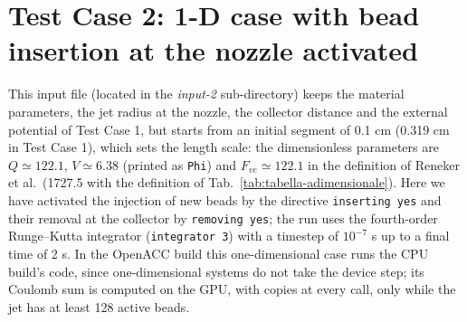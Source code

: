 \section{Test Case 2: 1-D case with bead insertion at the nozzle activated}

This input file (located in the \textit{input-2} sub-directory) keeps the
material parameters, the jet radius at the nozzle, the collector distance and
the external potential of Test Case 1, but starts from an initial segment of
0.1 cm (0.319 cm in Test Case 1), which sets the length scale: the
dimensionless parameters are $Q\simeq122.1$, $V\simeq6.38$ (printed as
\texttt{Phi}) and $F_{ve}\simeq122.1$ in the definition of Reneker et al.\
(1727.5 with the definition of Tab.~\ref{tab:tabella-adimensionale}). Here
we have activated the injection of new beads by the directive
\texttt{inserting yes} and their removal at the collector by
\texttt{removing yes}; the run uses the fourth-order Runge--Kutta integrator
(\texttt{integrator 3}) with a timestep of $10^{-7}$ s up to a final time of
2 s. In the OpenACC build this one-dimensional case runs the CPU build's
code, since one-dimensional systems do not take the device step; its
Coulomb sum is computed on the GPU, with copies at every call, only while
the jet has at least 128 active beads.
